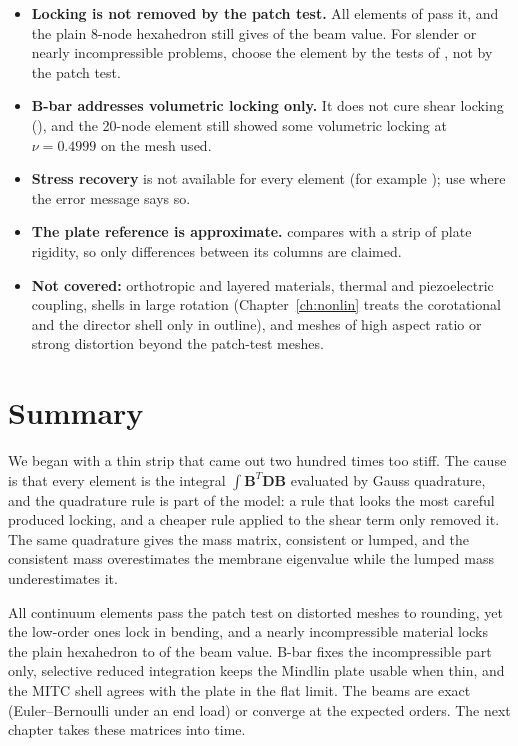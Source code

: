 \begin{limitsbox}
\begin{itemize}
\item \textbf{Locking is not removed by the patch test.} All elements of  pass it, and the plain 8-node hexahedron still gives \cecLockHexPlainA{} of the beam value. For slender or nearly incompressible problems, choose the element by the tests of , not by the patch test.
\item \textbf{B-bar addresses volumetric locking only.} It does not cure shear locking (), and the 20-node element still showed some volumetric locking at $\nu=0.4999$ on the mesh used.
\item \textbf{Stress recovery} is not available for every element (for example ); use  where the error message says so.
\item \textbf{The plate reference is approximate.}  compares with a strip of plate rigidity, so only differences between its columns are claimed.
\item \textbf{Not covered:} orthotropic and layered materials, thermal and piezoelectric coupling, shells in large rotation (Chapter~\ref{ch:nonlin} treats the corotational and the director shell only in outline), and meshes of high aspect ratio or strong distortion beyond the patch-test meshes.
\end{itemize}
\end{limitsbox}

\section{Summary}\label{sec:el-summary}

We began with a thin strip that came out two hundred times too stiff. The cause is that every element is the integral $\int\bm B^{T}\bm D\bm B$ evaluated by Gauss quadrature, and the quadrature rule is part of the model: a rule that looks the most careful produced locking, and a cheaper rule applied to the shear term only removed it. The same quadrature gives the mass matrix, consistent or lumped, and the consistent mass overestimates the membrane eigenvalue while the lumped mass underestimates it.

All continuum elements pass the patch test on distorted meshes to rounding, yet the low-order ones lock in bending, and a nearly incompressible material locks the plain hexahedron to \cecLockHexPlainB{} of the beam value. B-bar fixes the incompressible part only, selective reduced integration keeps the Mindlin plate usable when thin, and the MITC shell agrees with the plate in the flat limit. The beams are exact (Euler--Bernoulli under an end load) or converge at the expected orders. The next chapter takes these matrices into time.

